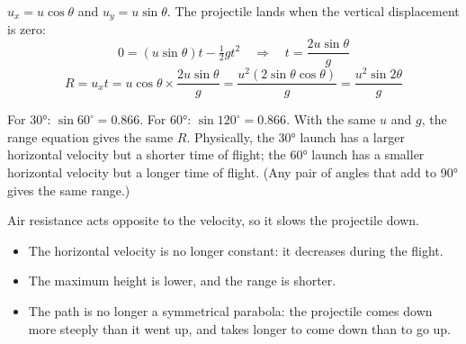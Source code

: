 \documentclass[12pt]{article}
\begin{document}
\ansq
{}
\begin{crit}
\end{crit}
\sample
$u_x = u\cos\theta$ and $u_y = u\sin\theta$. The projectile lands when the vertical displacement is
zero:
\[ 0 = (u\sin\theta)t - \tfrac{1}{2}gt^2 \quad\Rightarrow\quad t = \frac{2u\sin\theta}{g} \]
\[ R = u_x t = u\cos\theta \times \frac{2u\sin\theta}{g} = \frac{u^2(2\sin\theta\cos\theta)}{g}
     = \frac{u^2\sin 2\theta}{g} \]
\begin{crit}
\end{crit}
\sample
For \ang{30}: $\sin 60^\circ = 0.866$. For \ang{60}: $\sin 120^\circ = 0.866$. With the same $u$ and
$g$, the range equation gives the same $R$. Physically, the \ang{30} launch has a larger horizontal
velocity but a shorter time of flight; the \ang{60} launch has a smaller horizontal velocity but a
longer time of flight. (Any pair of angles that add to \ang{90} gives the same range.)

\ansq
\begin{crit}
\end{crit}
\sample
Air resistance acts opposite to the velocity, so it slows the projectile down.
\begin{itemize}
  \item The horizontal velocity is no longer constant: it decreases during the flight.
  \item The maximum height is lower, and the range is shorter.
  \item The path is no longer a symmetrical parabola: the projectile comes down more steeply than it
        went up, and takes longer to come down than to go up.
\end{itemize}
\end{document}
